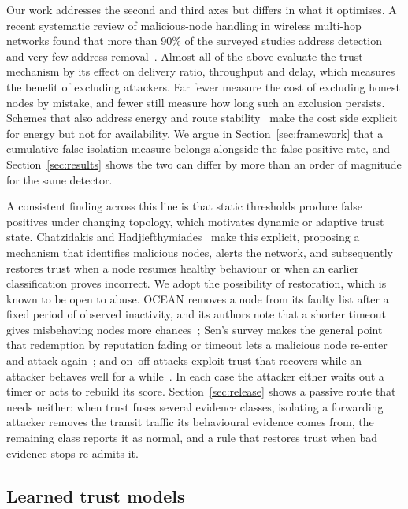 Our work addresses the second and third axes but differs in what it
optimises. A recent systematic review of malicious-node handling in wireless
multi-hop networks found that more than 90\% of the surveyed studies address
detection and very few address removal~\cite{pourdehghan2025review}. Almost all of the above evaluate the trust mechanism by its
effect on delivery ratio, throughput and delay, which measures the benefit
of excluding attackers. Far fewer measure the cost of excluding honest nodes
by mistake, and fewer still measure how long such an exclusion persists.
Schemes that also address energy and route
stability~\cite{thirunavukkarasu2022cluster,ponguwala2019e2sr} make the cost
side explicit for energy but not for availability. We argue in
Section~\ref{sec:framework} that a cumulative false-isolation measure
belongs alongside the false-positive rate, and Section~\ref{sec:results}
shows the two can differ by more than an order of magnitude for the same
detector.

A consistent finding across this line is that static thresholds produce
false positives under changing topology, which motivates dynamic or adaptive
trust state. Chatzidakis and Hadjiefthymiades~\cite{chatzidakis2022trust}
make this explicit, proposing a mechanism that identifies malicious nodes,
alerts the network, and subsequently restores trust when a node resumes
healthy behaviour or when an earlier classification proves incorrect. We
adopt the possibility of restoration, which is known to be open to abuse.
OCEAN removes a node from its faulty list after a fixed period of
observed inactivity, and its authors note that a shorter timeout gives
misbehaving nodes more chances~\cite{bansal2003ocean}; Sen's survey makes the
general point that redemption by reputation fading or timeout lets a
malicious node re-enter and attack again~\cite{sen2010survey}; and on--off
attacks exploit trust that recovers while an attacker behaves well for a
while~\cite{sun2006attacks}. In each case the attacker either waits out a
timer or acts to rebuild its score. Section~\ref{sec:release} shows a
passive route that needs neither: when trust fuses several evidence
classes, isolating a forwarding attacker removes the transit traffic its
behavioural evidence comes from, the remaining class reports it as normal,
and a rule that restores trust when bad evidence stops re-admits it.

\subsection{Learned trust models}

